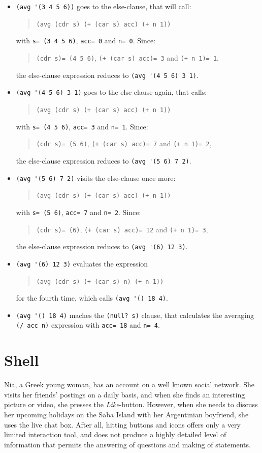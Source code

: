 \documentclass[a4paper,12pt]{book}
\begin{document}
\begin{itemize}
\item\verb|(avg '(3 4 5 6))|
goes to the else-clause, that will call:
\begin{quote}
\verb|(avg (cdr s) (+ (car s) acc) (+ n 1))|
\end{quote}
with
\verb|s= (3 4 5 6)|, \verb|acc= 0|
and \verb|n= 0|. Since:
\begin{quote}
\verb|(cdr s)= (4 5 6)|,
\verb|(+ (car s) acc)= 3| and
\verb|(+ n 1)= 1|,
\end{quote}
the else-clause expression reduces to
\verb|(avg '(4 5 6) 3 1)|.
\item\verb|(avg '(4 5 6) 3 1)| goes to the
else-clause again, that calls:
\begin{quote}
\verb|(avg (cdr s) (+ (car s) acc) (+ n 1))|
\end{quote}
with \verb|s= (4 5 6)|, \verb|acc= 3| and \verb|n= 1|.
Since:
\begin{quote}
\verb|(cdr s)= (5 6)|,
\verb|(+ (car s) acc)= 7| and
\verb|(+ n 1)= 2|,
\end{quote}
the else-clause expression reduces to
\verb|(avg '(5 6) 7 2)|.
\item \verb|(avg '(5 6) 7 2)| visits 
the else-clause once more:
\begin{quote}
\verb|(avg (cdr s) (+ (car s) acc) (+ n 1))|
\end{quote}
with \verb|s= (5 6)|, \verb|acc= 7| and \verb|n= 2|.
Since:
\begin{quote}
\verb|(cdr s)= (6)|,
\verb|(+ (car s) acc)= 12| and
\verb|(+ n 1)= 3|,
\end{quote}
the else-clause expression reduces to
\verb|(avg '(6) 12 3)|.
\item\verb|(avg '(6) 12 3)| evaluates the
expression
\begin{quote}
\verb|(avg (cdr s) (+ (car s) n) (+ n 1))|
\end{quote} 
for the fourth time, which calls \verb|(avg '() 18 4)|.
\item \verb|(avg '() 18 4)|  maches
the \verb|(null? s)| clause, that calculates the
averaging \verb|(/ acc n)| expression
with \verb|acc= 18| and \verb|n= 4|.
\end{itemize}



\chapter{Shell}
Nia, a Greek young woman, has an
account on a well known social network.
She visits her friends' postings on a daily basis,
and when she finds an interesting picture or video,
she presses the {\em Like}-button. However, when
she needs to discuss her upcoming holidays on the Saba Island
with her Argentinian boyfriend, she uses the
live chat box. After all, hitting buttons and
icons offers only a very limited interaction tool,
and does not produce a highly detailed
level of information that permits the answering
of questions and making of statements.
\end{document}
